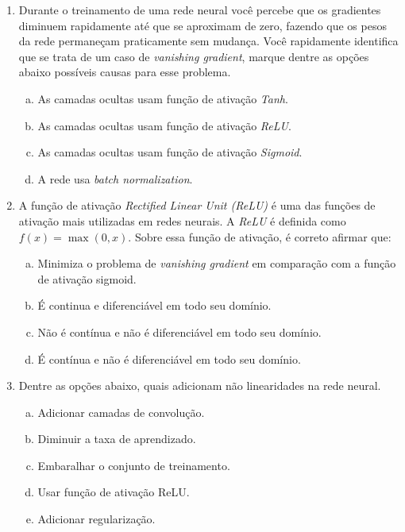 \documentclass{dlproblemset}
\begin{document}
\begin{enumerate}[1)]
    \item Durante o treinamento de uma rede neural você percebe que os gradientes diminuem rapidamente até que se aproximam de zero, fazendo que os pesos da rede permaneçam praticamente sem mudança. Você rapidamente identifica que se trata de um caso de \textit{vanishing gradient}, marque dentre as opções abaixo possíveis causas para esse problema.

	\begin{enumerate}[(a)]
	    \item As camadas ocultas usam função de ativação \textit{Tanh}.
	    \item As camadas ocultas usam função de ativação \textit{ReLU}.
	    \item As camadas ocultas usam função de ativação \textit{Sigmoid}.
	    \item A rede usa \textit{batch normalization}.
	\end{enumerate}

    \item A função de ativação \textit{Rectified Linear Unit (ReLU)} é uma das funções de ativação mais utilizadas em redes neurais. A \textit{ReLU} é definida como $f(x) = \max(0,x)$. Sobre essa função de ativação, é correto afirmar que:
    \begin{enumerate}[(a)]
	    \item Minimiza o problema de \textit{vanishing gradient} em comparação com a função de ativação sigmoid.
	    \item É continua e diferenciável em todo seu domínio.
	    \item Não é contínua e não é diferenciável em todo seu domínio.
	    \item É contínua e não é diferenciável em todo seu domínio.
    \end{enumerate}

    \item Dentre as opções abaixo, quais adicionam não linearidades na rede neural.

    \begin{enumerate}[(a)]
        \item Adicionar camadas de convolução.
        \item Diminuir a taxa de aprendizado.
        \item Embaralhar o conjunto de treinamento.
        \item Usar função de ativação ReLU.
        \item Adicionar regularização.
    \end{enumerate}


\end{enumerate}
\end{document}

